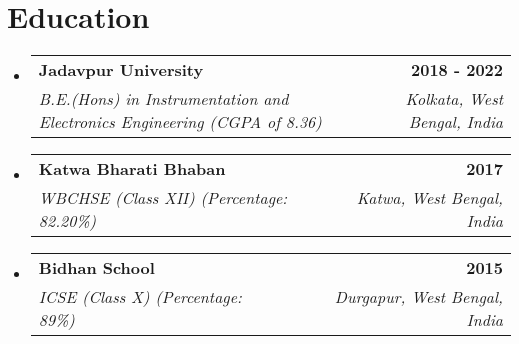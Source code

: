 \documentclass[letterpaper,11pt]{article}
\makeatletter
\newcommand{\resumeItem}[1]{
  \item\small{
    {#1 \vspace{-2pt}}
  }
}
\newcommand{\resumeSubheading}[4]{
  \vspace{-2pt}\item
    \begin{tabular*}{1.0\textwidth}[t]{l@{\extracolsep{\fill}}r}
      \textbf{#1} & \textbf{\small #2} \\
      \textit{\small#3} & \textit{\small #4} \\
    \end{tabular*}\vspace{-7pt}
}
\newcommand{\resumeSubHeadingListStart}{\begin{itemize}[leftmargin=0.0in, label={}]}
\newcommand{\resumeSubHeadingListEnd}{\end{itemize}}
\newcommand{\resumeItemListStart}{\begin{itemize}}
\newcommand{\resumeItemListEnd}{\end{itemize}\vspace{-5pt}}
\makeatother
\begin{document}
\smallskip
\section{Education}
  \resumeSubHeadingListStart
  \resumeSubheading
    {Jadavpur University}{2018 - 2022}
      {B.E.(Hons) in Instrumentation and Electronics Engineering (CGPA of 8.36)}{Kolkata, West Bengal, India}
    \resumeSubheading
      {Katwa Bharati Bhaban}{2017}
      {WBCHSE (Class XII) (Percentage: 82.20\%)}{Katwa, West Bengal, India}
     \resumeSubheading
      {Bidhan School}{2015}
      {ICSE (Class X) (Percentage: 89\%)}{Durgapur, West Bengal, India}
  \resumeSubHeadingListEnd
\vspace{-9pt}

%
 
 
\smallskip
\end{document}
